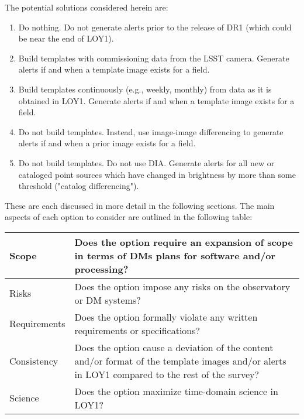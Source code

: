 \documentclass[DM,lsstdraft,toc]{lsstdoc}
\begin{document}
The potential solutions considered herein are:
\begin{enumerate}
\item Do nothing. Do not generate alerts prior to the release of DR1 (which could be near the end of LOY1).
\item Build templates with commissioning data from the LSST camera. Generate alerts if and when a template image exists for a field. 
\item Build templates continuously (e.g., weekly, monthly) from data as it is obtained in LOY1. Generate alerts if and when a template image exists for a field.
\item Do not build templates. Instead, use image-image differencing to generate alerts if and when a prior image exists for a field.
\item Do not build templates. Do not use DIA. Generate alerts for all new or cataloged point sources which have changed in brightness by more than some threshold ("catalog differencing").
\end{enumerate}

These are each discussed in more detail in the following sections. The main aspects of each option to consider are outlined in the following table:
\begin{center}
\begin{tabular}{|p{2.5cm}|p{13cm}|}
\hline
Scope & Does the option require an expansion of scope in terms of DMs plans for software and/or processing? \\
\hline
Risks & Does the option impose any risks on the observatory or DM systems?  \\
\hline
Requirements & Does the option formally violate any written requirements or specifications? \\
\hline
Consistency & Does the option cause a deviation of the content and/or format of the template images and/or alerts in LOY1 compared to the rest of the survey? \\ %
\hline
Science & Does the option maximize time-domain science in LOY1? \\
\hline
\end{tabular}
\end{center} 
\end{document}
